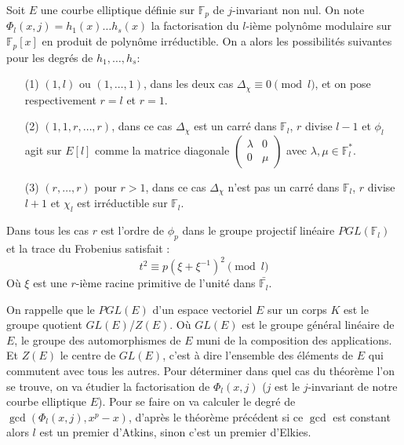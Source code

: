 \documentclass[12pt]{article}
\begin{document}
\begin{thm}
\label{thm calcul r}
Soit $E$ une courbe elliptique définie sur $\mathbb{F}_p$ de $j$-invariant non nul. On note $\Phi_l(x,j) = h_1(x) \ldots h_s(x)$ la factorisation du $l$-ième polynôme modulaire sur $\mathbb{F}_p[x]$ en produit de polynôme irréductible. On a alors les possibilités suivantes pour les degrés de $h_1, \ldots, h_s$:
\begin{itemize}
\item[(1)] $(1,l)$ ou $(1,\ldots,1)$, dans les deux cas $\Delta_{\chi} \equiv 0 \pmod l$, et on pose respectivement $r=l $ et $r=1$.
\item[(2)] $(1,1,r,\ldots,r)$, dans ce cas $\Delta_{\chi}$ est un carré dans $\mathbb{F}_l$, $r$ divise $l-1$ et $\phi_l$ agit sur $E[l]$ comme la matrice diagonale $\begin{pmatrix}
\lambda & 0 \\
0 & \mu
\end{pmatrix}$ avec $\lambda,\mu \in \mathbb{F}_l^*$.
\item[(3)] $(r, \ldots, r)$ pour $r>1$, dans ce cas $\Delta_{\chi}$ n'est pas un carré dans $\mathbb{F}_l$, $r$ divise $l+1$ et $\chi_l$ est irréductible sur $\mathbb{F}_l$.
\end{itemize}

Dans tous les cas $r$ est l'ordre de $\phi_p$ dans le groupe projectif linéaire $PGL(\mathbb{F}_l)$ et la trace du Frobenius satisfait : 
\begin{equation}
\label{trace with root of unity}
t^2 \equiv p(\xi+\xi^{-1})^2 \pmod l
\end{equation}
Où $\xi$ est une $r$-ième racine primitive de l'unité dans $\bar{\mathbb{F}_l}$.
\end{thm}
 On rappelle que le $PGL(E)$ d'un espace vectoriel $E$ sur un corps $K$ est le groupe quotient $GL(E)$/$Z(E)$. Où $GL(E)$ est le groupe général linéaire de $E$, le groupe des automorphismes de $E$ muni de la composition des applications. Et $Z(E)$ le centre de $GL(E)$, c'est à dire l'ensemble des éléments de $E$ qui commutent avec tous les autres.
\newline
Pour déterminer dans quel cas du théorème l'on se trouve, on va étudier la factorisation de $\Phi_l(x,j)$ ($j$ est le $j$-invariant de notre courbe elliptique $E$). Pour se faire on va calculer le degré de $\gcd(\Phi_l(x,j),x^p-x)$, d'après le théorème précédent si ce $\gcd$ est constant alors $l$ est un premier d'Atkins, sinon c'est un premier d'Elkies.
\end{document}
